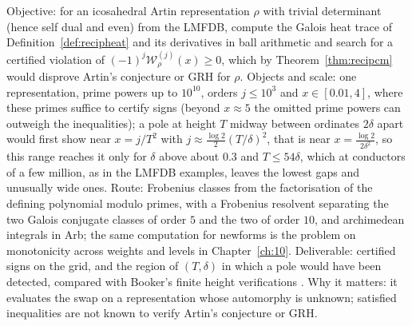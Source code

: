 \begin{compproblem}\label{cp:recipicosa}
Objective: for an icosahedral Artin representation $\rho$ with trivial determinant (hence self dual and even) from the LMFDB, compute the Galois heat trace of Definition~\ref{def:recipheat} and its derivatives in ball arithmetic and search for a certified violation of $(-1)^j\mathcal W_\rho^{(j)}(x)\ge0$, which by Theorem~\ref{thm:recipcm} would disprove Artin's conjecture or GRH for $\rho$. Objects and scale: one representation, prime powers up to $10^{10}$, orders $j\le10^3$ and $x\in[0.01,4]$, where these primes suffice to certify signs (beyond $x\approx5$ the omitted prime powers can outweigh the inequalities); a pole at height $T$ midway between ordinates $2\delta$ apart would first show near $x=j/T^2$ with $j\approx\frac{\log2}2(T/\delta)^2$, that is near $x=\frac{\log2}{2\delta^2}$, so this range reaches it only for $\delta$ above about $0.3$ and $T\le54\delta$, which at conductors of a few million, as in the LMFDB examples, leaves the lowest gaps and unusually wide ones. Route: Frobenius classes from the factorisation of the defining polynomial modulo primes, with a Frobenius resolvent \cite{dokchitser2013} separating the two Galois conjugate classes of order $5$ and the two of order $10$, and archimedean integrals in Arb; the same computation for newforms is the problem on monotonicity across weights and levels in Chapter~\ref{ch:10}. Deliverable: certified signs on the grid, and the region of $(T,\delta)$ in which a pole would have been detected, compared with Booker's finite height verifications \cite{booker2006}. Why it matters: it evaluates the swap on a representation whose automorphy is unknown; satisfied inequalities are not known to verify Artin's conjecture or GRH.
\end{compproblem}

